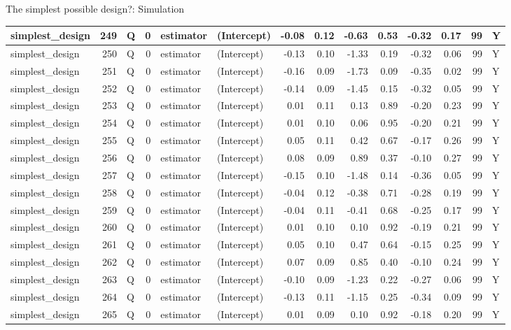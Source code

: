 \documentclass[
  11pt,
  ignorenonframetext,
]{beamer}
\begin{document}
\begin{frame}[fragile]{The simplest possible design?: Simulation}
\begin{tabular}{l|r|l|r|l|l|r|r|r|r|r|r|r|l}
\hline
simplest\_design & 249 & Q & 0 & estimator & (Intercept) & -0.08 & 0.12 & -0.63 & 0.53 & -0.32 & 0.17 & 99 & Y\\
\hline
simplest\_design & 250 & Q & 0 & estimator & (Intercept) & -0.13 & 0.10 & -1.33 & 0.19 & -0.32 & 0.06 & 99 & Y\\
\hline
simplest\_design & 251 & Q & 0 & estimator & (Intercept) & -0.16 & 0.09 & -1.73 & 0.09 & -0.35 & 0.02 & 99 & Y\\
\hline
simplest\_design & 252 & Q & 0 & estimator & (Intercept) & -0.14 & 0.09 & -1.45 & 0.15 & -0.32 & 0.05 & 99 & Y\\
\hline
simplest\_design & 253 & Q & 0 & estimator & (Intercept) & 0.01 & 0.11 & 0.13 & 0.89 & -0.20 & 0.23 & 99 & Y\\
\hline
simplest\_design & 254 & Q & 0 & estimator & (Intercept) & 0.01 & 0.10 & 0.06 & 0.95 & -0.20 & 0.21 & 99 & Y\\
\hline
simplest\_design & 255 & Q & 0 & estimator & (Intercept) & 0.05 & 0.11 & 0.42 & 0.67 & -0.17 & 0.26 & 99 & Y\\
\hline
simplest\_design & 256 & Q & 0 & estimator & (Intercept) & 0.08 & 0.09 & 0.89 & 0.37 & -0.10 & 0.27 & 99 & Y\\
\hline
simplest\_design & 257 & Q & 0 & estimator & (Intercept) & -0.15 & 0.10 & -1.48 & 0.14 & -0.36 & 0.05 & 99 & Y\\
\hline
simplest\_design & 258 & Q & 0 & estimator & (Intercept) & -0.04 & 0.12 & -0.38 & 0.71 & -0.28 & 0.19 & 99 & Y\\
\hline
simplest\_design & 259 & Q & 0 & estimator & (Intercept) & -0.04 & 0.11 & -0.41 & 0.68 & -0.25 & 0.17 & 99 & Y\\
\hline
simplest\_design & 260 & Q & 0 & estimator & (Intercept) & 0.01 & 0.10 & 0.10 & 0.92 & -0.19 & 0.21 & 99 & Y\\
\hline
simplest\_design & 261 & Q & 0 & estimator & (Intercept) & 0.05 & 0.10 & 0.47 & 0.64 & -0.15 & 0.25 & 99 & Y\\
\hline
simplest\_design & 262 & Q & 0 & estimator & (Intercept) & 0.07 & 0.09 & 0.85 & 0.40 & -0.10 & 0.24 & 99 & Y\\
\hline
simplest\_design & 263 & Q & 0 & estimator & (Intercept) & -0.10 & 0.09 & -1.23 & 0.22 & -0.27 & 0.06 & 99 & Y\\
\hline
simplest\_design & 264 & Q & 0 & estimator & (Intercept) & -0.13 & 0.11 & -1.15 & 0.25 & -0.34 & 0.09 & 99 & Y\\
\hline
simplest\_design & 265 & Q & 0 & estimator & (Intercept) & 0.01 & 0.09 & 0.10 & 0.92 & -0.18 & 0.20 & 99 & Y\\

\end{tabular}
\end{frame}
\end{document}
